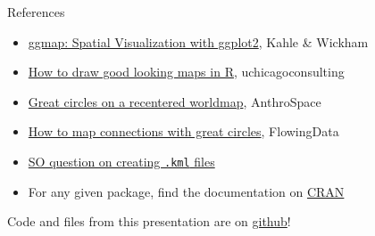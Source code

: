 \documentclass[sans,aspectratio=169,presentation,bigger,fleqn]{beamer}
\begin{document}
\begin{frame}[fragile,label=sec-35]{References}
 \begin{itemize}
\item \href{http://stat405.had.co.nz/ggmap.pdf}{ggmap: Spatial Visualization with ggplot2}, Kahle \& Wickham
\item \href{http://uchicagoconsulting.wordpress.com/2011/04/18/how-to-draw-good-looking-maps-in-r/}{How to draw good looking maps in R}, uchicagoconsulting
\item \href{http://www.stanford.edu/~cengel/cgi-bin/anthrospace/great-circles-on-a-recentered-worldmap-in-ggplot}{Great circles on a recentered worldmap}, AnthroSpace
\item \href{http://flowingdata.com/2011/05/11/how-to-map-connections-with-great-circles/}{How to map connections with great circles}, FlowingData
\item \href{http://stackoverflow.com/questions/21487010/assistance-with-name-and-styleurl-in-kml-when-using-writeogr-from-rgdal}{SO question on creating \texttt{.kml} files}
\item For any given package, find the documentation on \href{http://cran.r-project.org/}{CRAN}
\end{itemize}

\vspace{0.5cm}

Code and files from this presentation are on \href{https://github.com/jwhendy/devFest-geo}{github}!
\end{frame}
\end{document}
